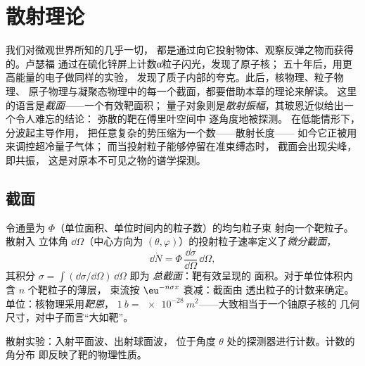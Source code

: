\chapter{散射理论}\label{ch:b3:scattering-theory}

我们对微观世界所知的几乎一切，
都是通过向它投射物体、观察反弹之物而获得的。卢瑟福
通过在硫化锌屏上计数α粒子闪光，发现了原子核；
五十年后，用更高能量的电子做同样的实验，
发现了质子内部的夸克。此后，核物理、粒子物理、
原子物理与凝聚态物理中的每一个截面，都要借助本章的理论来解读。
这里的语言是\emph{截面}——一个有效靶面积；
量子对象则是\emph{散射振幅}，其玻恩近似给出一个令人难忘的结论：
弥散的靶在傅里叶空间中
逐角度地被探测。
在低能情形下，分波起主导作用，
把任意复杂的势压缩为一个数——散射长度——
如今它正被用来调控超冷量子气体；
而当投射粒子能够停留在准束缚态时，
截面会出现尖峰，即共振，
这是对原本不可见之物的谱学探测。

\section{截面}

\begin{definition}[截面]\label{def:b3:scattering-theory:cross-section}
令通量为 $\Phi$（单位面积、单位时间内的粒子数）的均匀粒子束
射向一个靶粒子。散射入
立体角 $\dd\Omega$（中心方向为 $(\theta,
\varphi)$）的投射粒子速率定义了\emph{微分截面}，
\[
\dd\dot N = \Phi\,\frac{\dd\sigma}{\dd\Omega}\,\dd\Omega ,
\]
其积分 $\sigma = \int(\dd\sigma/\dd\Omega)\,\dd\Omega$ 即为
\emph{总截面}：靶有效呈现的
面积。对于单位体积内含 $n$ 个靶粒子的薄层，
束流按 $\eu^{-n\sigma x}$ 衰减：截面由
透出粒子的计数来确定。单位：核物理采用\emph{靶恩}，
$\qty{1}{b} = \qty{e-28}{m^2}$——大致相当于一个铀原子核的
几何尺寸，对中子而言“大如靶”。
\end{definition}

\begin{omfigure}

{\small 散射实验：入射平面波、出射球面波，
位于角度 $\theta$ 处的探测器进行计数。计数的角分布
即反映了靶的物理性质。}
\end{omfigure}

